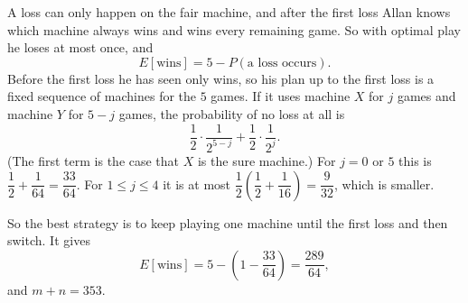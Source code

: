 A loss can only happen on the fair machine, and after the first loss Allan knows which machine always wins and wins every remaining game. So with optimal play he loses at most once, and
\[E[\text{wins}]=5-P(\text{a loss occurs}).\]
Before the first loss he has seen only wins, so his plan up to the first loss is a fixed sequence of machines for the $5$ games. If it uses machine $X$ for $j$ games and machine $Y$ for $5-j$ games, the probability of no loss at all is
\[\dfrac12\cdot\dfrac1{2^{5-j}}+\dfrac12\cdot\dfrac1{2^{j}}.\]
(The first term is the case that $X$ is the sure machine.) For $j=0$ or $5$ this is $\dfrac12+\dfrac1{64}=\dfrac{33}{64}$. For $1\le j\le4$ it is at most $\dfrac12\left(\dfrac12+\dfrac1{16}\right)=\dfrac{9}{32}$, which is smaller.

So the best strategy is to keep playing one machine until the first loss and then switch. It gives
\[E[\text{wins}]=5-\left(1-\dfrac{33}{64}\right)=\dfrac{289}{64},\]
and $m+n=\boxed{353}$.

